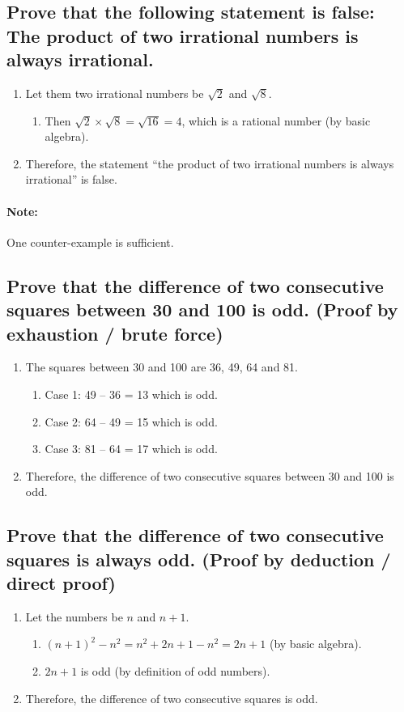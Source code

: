 \documentclass{article}
\begin{document}
\subsection*{Prove that the following statement is false: The product of two irrational numbers is always irrational.}
\begin{enumerate}
    \item Let them two irrational numbers be $\sqrt{2}$ and $\sqrt{8}$. 
    \begin{enumerate}
        \item Then $\sqrt{2}\times\sqrt{8}=\sqrt{16}=4$, which is a rational number (by basic algebra).
    \end{enumerate}
    \item Therefore, the statement ``the product of two irrational numbers is always irrational'' is false.
\end{enumerate}
\paragraph{Note:}One counter-example is sufficient. 
\vspace{0.1cm}

\subsection*{Prove that the difference of two consecutive squares between 30 and 100 is odd. (Proof by exhaustion / brute force)}
\begin{enumerate}
    \item The squares between 30 and 100 are 36, 49, 64 and 81.
    \begin{enumerate}
        \item Case 1: 49 – 36 = 13 which is odd.
        \item Case 2: 64 – 49 = 15 which is odd.
        \item Case 3: 81 – 64 = 17 which is odd.
    \end{enumerate}
    \item Therefore, the difference of two consecutive squares
between 30 and 100 is odd.
\end{enumerate}
\vspace{0.1cm}

\subsection*{Prove that the difference of two consecutive squares is always odd. (Proof by deduction / direct proof)}
\begin{enumerate}
    \item Let the numbers be $n$ and $n+1$.
    \begin{enumerate}
        \item $(n+1)^2-n^2=n^2+2n+1-n^2=2n+1$ (by basic algebra).
        \item $2n+1$ is odd (by definition of odd numbers).
    \end{enumerate}
    \item Therefore, the difference of two consecutive squares is odd.
\end{enumerate}
\vspace{0.1cm}
\end{document}
